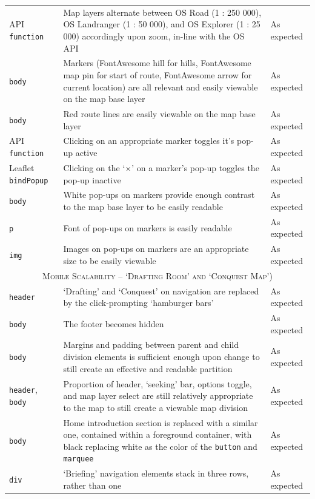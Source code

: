 \documentclass[11pt, english]{article}
\begin{document}
\begin{center}
\begin{longtable}{p{3cm}p{8cm}p{2cm}}
		API \texttt{function} & Map layers alternate between OS Road (1 : 250 000), OS Landranger (1 : 50 000), and OS Explorer (1 : 25 000) accordingly upon zoom, in-line with the OS API & As expected\\
		\texttt{body} & Markers (FontAwesome hill for hills, FontAwesome map pin for start of route, FontAwesome arrow for current location) are all relevant and easily viewable on the map base layer & As expected\\
		\texttt{body} & Red route lines are easily viewable on the map base layer & As expected\\
		API \texttt{function} & Clicking on an appropriate marker toggles it's pop-up active & As expected\\
		Leaflet \texttt{bindPopup} & Clicking on the `$\times$' on a marker's pop-up toggles the pop-up inactive & As expected\\
		\texttt{body} & White pop-ups on markers provide enough contrast to the map base layer to be easily readable & As expected\\
		\texttt{p} & Font of pop-ups on markers is easily readable & As expected\\
		\texttt{img} & Images on pop-ups on markers are an appropriate size to be easily viewable & As expected\\
		\hline
		\multicolumn{3}{c}{\textsc{Mobile Scalability -- `Drafting Room' and `Conquest Map')}}\\
		\hline
		\texttt{header} & `Drafting' and `Conquest' on navigation are replaced by the click-prompting `hamburger bars' & As expected\\
		\texttt{body} & The footer becomes hidden & As expected\\
		\texttt{body} & Margins and padding between parent and child division elements is sufficient enough upon change to still create an effective and readable partition & As expected\\
		\texttt{header}, \texttt{body} & Proportion of header, `seeking' bar, options toggle, and map layer select are still relatively appropriate to the map to still create a viewable map division & As expected\\
		\texttt{body} & Home introduction section is replaced with a similar one, contained within a foreground container, with black replacing white as the color of the \texttt{button} and \texttt{marquee} & As expected\\
		\texttt{div} & `Briefing' navigation elements stack in three rows, rather than one & As expected\\

\end{longtable}
\end{center}
\end{document}
